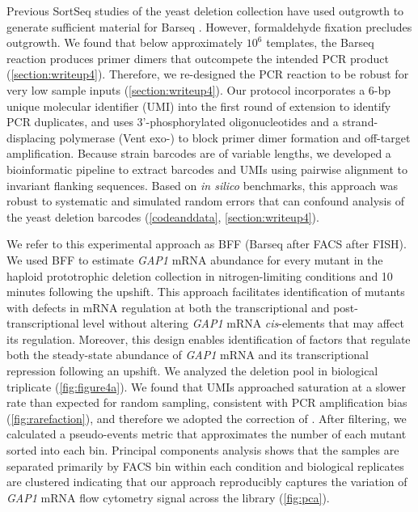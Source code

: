 Previous SortSeq studies of
the yeast deletion collection have used outgrowth 
to generate sufficient material for 
Barseq \parencite{sliva2016barcode}. However, formaldehyde fixation precludes
outgrowth. We found that below approximately $10^6$ templates, the
Barseq reaction produces primer dimers
that outcompete the intended PCR product (\autoref{section:writeup4}). 
Therefore, we re-designed the
PCR reaction \parencite{robinson2014design,smith2009quantitative} to be robust for
very low sample inputs (\autoref{section:writeup4}). Our protocol
incorporates a 6-bp unique molecular identifier (UMI) into the first
round of extension to identify PCR duplicates, 
and uses 3’-phosphorylated oligonucleotides and a
strand-displacing polymerase (Vent exo-) to block primer dimer formation and 
off-target amplification. 
Because strain barcodes are of variable lengths, 
we developed a bioinformatic pipeline to extract barcodes and UMIs 
using pairwise alignment to invariant flanking sequences.
Based on \textit{in silico} benchmarks, this
approach was robust to systematic and simulated random errors 
that can confound analysis of the yeast deletion barcodes 
(\autoref{codeanddata}, \autoref{section:writeup4}). 

We refer to this experimental approach as BFF (Barseq after FACS after FISH). 
We used BFF to estimate \textit{GAP1} mRNA abundance for every mutant in the
haploid prototrophic deletion collection
\parencite{vandersluis2014broad} in
nitrogen-limiting conditions and 10 minutes following the upshift. 
This approach facilitates identification of mutants with
defects in mRNA regulation at both the transcriptional and
post-transcriptional level without altering \textit{GAP1} mRNA 
\textit{cis}-elements that may affect its regulation. 
Moreover, this design enables identification of factors that 
regulate both the steady-state abundance of \textit{GAP1} mRNA and 
its transcriptional repression following an upshift.
We analyzed the deletion pool in biological triplicate
(\autoref{fig:figure4a}). We found that UMIs 
approached saturation at a slower rate than expected for random sampling,
consistent with PCR amplification bias 
(\autoref{fig:rarefaction}), and therefore we adopted the 
correction of \cite{fu2011counting}. After
filtering, we calculated a
pseudo-events metric that approximates the number of each mutant sorted
into each bin. 
Principal components analysis shows that the samples are 
separated primarily by FACS bin within each
condition and biological replicates are clustered indicating that our
approach reproducibly captures the variation of  \textit{GAP1} mRNA flow
cytometry signal across the library (\autoref{fig:pca}). 

